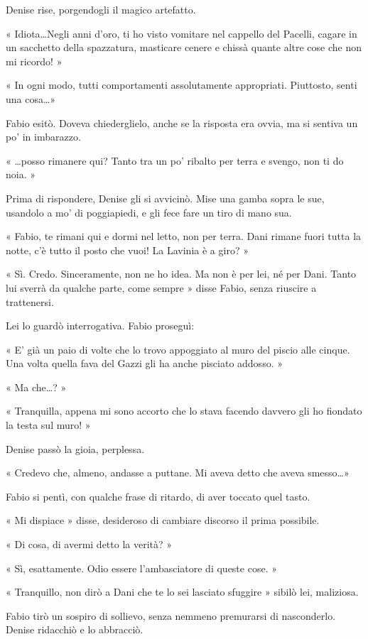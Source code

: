 Denise rise, porgendogli il magico artefatto.

« Idiota\ldots Negli anni d'oro, ti ho visto vomitare nel cappello del Pacelli, cagare in un sacchetto della spazzatura, masticare cenere e chissà quante altre cose che non mi ricordo! »

« In ogni modo, tutti comportamenti assolutamente appropriati. Piuttosto, senti una cosa\ldots »

Fabio esitò. Doveva chiederglielo, anche se la risposta era ovvia, ma si sentiva un po' in imbarazzo.

« \ldots posso rimanere qui? Tanto tra un po' ribalto per terra e svengo, non ti do noia. »

Prima di rispondere, Denise gli si avvicinò. Mise una gamba sopra le sue, usandolo a mo' di poggiapiedi, e gli fece fare un tiro di mano sua.

« Fabio, te rimani qui e dormi nel letto, non per terra. Dani rimane fuori tutta la notte, c'è tutto il posto che vuoi! La Lavinia è a giro? »

« Sì. Credo. Sinceramente, non ne ho idea. Ma non è per lei, né per Dani. Tanto lui sverrà da qualche parte, come sempre » disse Fabio, senza riuscire a trattenersi.

Lei lo guardò interrogativa. Fabio proseguì:

« E' già un paio di volte che lo trovo appoggiato al muro del piscio alle cinque. Una volta quella fava del Gazzi gli ha anche pisciato addosso. »

« Ma che\ldots? »

« Tranquilla, appena mi sono accorto che lo stava facendo davvero gli ho fiondato la testa sul muro! »

Denise passò la gioia, perplessa.

« Credevo che, almeno, andasse a puttane. Mi aveva detto che aveva smesso\ldots »

Fabio si pentì, con qualche frase di ritardo, di aver toccato quel tasto.

« Mi dispiace » disse, desideroso di cambiare discorso il prima possibile.

« Di cosa, di avermi detto la verità? »

« Sì, esattamente. Odio essere l'ambasciatore di queste cose. »

« Tranquillo, non dirò a Dani che te lo sei lasciato sfuggire » sibilò lei, maliziosa.

Fabio tirò un sospiro di sollievo, senza nemmeno premurarsi di nasconderlo. Denise ridacchiò e lo abbracciò.

